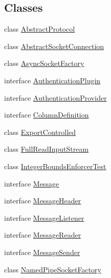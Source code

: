 \subsection*{Classes}
\begin{DoxyCompactItemize}
\item 
class \mbox{\hyperlink{classcom_1_1mysql_1_1cj_1_1protocol_1_1_abstract_protocol}{Abstract\+Protocol}}
\item 
class \mbox{\hyperlink{classcom_1_1mysql_1_1cj_1_1protocol_1_1_abstract_socket_connection}{Abstract\+Socket\+Connection}}
\item 
class \mbox{\hyperlink{classcom_1_1mysql_1_1cj_1_1protocol_1_1_async_socket_factory}{Async\+Socket\+Factory}}
\item 
interface \mbox{\hyperlink{interfacecom_1_1mysql_1_1cj_1_1protocol_1_1_authentication_plugin}{Authentication\+Plugin}}
\item 
interface \mbox{\hyperlink{interfacecom_1_1mysql_1_1cj_1_1protocol_1_1_authentication_provider}{Authentication\+Provider}}
\item 
interface \mbox{\hyperlink{interfacecom_1_1mysql_1_1cj_1_1protocol_1_1_column_definition}{Column\+Definition}}
\item 
class \mbox{\hyperlink{classcom_1_1mysql_1_1cj_1_1protocol_1_1_export_controlled}{Export\+Controlled}}
\item 
class \mbox{\hyperlink{classcom_1_1mysql_1_1cj_1_1protocol_1_1_full_read_input_stream}{Full\+Read\+Input\+Stream}}
\item 
class \mbox{\hyperlink{classcom_1_1mysql_1_1cj_1_1protocol_1_1_integer_bounds_enforcer_test}{Integer\+Bounds\+Enforcer\+Test}}
\item 
interface \mbox{\hyperlink{interfacecom_1_1mysql_1_1cj_1_1protocol_1_1_message}{Message}}
\item 
interface \mbox{\hyperlink{interfacecom_1_1mysql_1_1cj_1_1protocol_1_1_message_header}{Message\+Header}}
\item 
interface \mbox{\hyperlink{interfacecom_1_1mysql_1_1cj_1_1protocol_1_1_message_listener}{Message\+Listener}}
\item 
interface \mbox{\hyperlink{interfacecom_1_1mysql_1_1cj_1_1protocol_1_1_message_reader}{Message\+Reader}}
\item 
interface \mbox{\hyperlink{interfacecom_1_1mysql_1_1cj_1_1protocol_1_1_message_sender}{Message\+Sender}}
\item 
class \mbox{\hyperlink{classcom_1_1mysql_1_1cj_1_1protocol_1_1_named_pipe_socket_factory}{Named\+Pipe\+Socket\+Factory}}

\end{DoxyCompactItemize}
